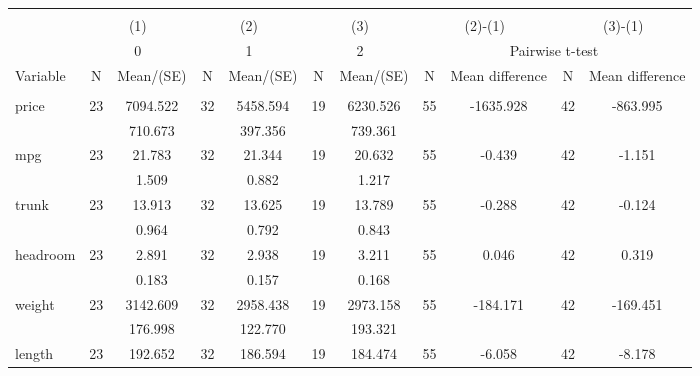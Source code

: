 
\begin{tabular}{@{\extracolsep{5pt}}lcccccccccc}
\\[-1.8ex]\hline \hline \\[-1.8ex]
 & \multicolumn{2}{c}{(1)}  & \multicolumn{2}{c}{(2)}  & \multicolumn{2}{c}{(3)}  & \multicolumn{2}{c}{(2)-(1)} & \multicolumn{2}{c}{(3)-(1)} \\
 & \multicolumn{2}{c}{0}  & \multicolumn{2}{c}{1}  & \multicolumn{2}{c}{2}  & \multicolumn{4}{c}{Pairwise t-test}  \\
Variable & N & Mean/(SE) & N & Mean/(SE) & N & Mean/(SE) & N & Mean difference & N & Mean difference \\ \hline \\[-1.8ex] 
price   & 23    &  7094.522    & 32    &  5458.594    & 19    &  6230.526    & 55    & -1635.928    & 42    &  -863.995   \\
 &   &   710.673  &   &   397.356  &   &   739.361  &   &  &   &   \\
mpg   & 23    &    21.783    & 32    &    21.344    & 19    &    20.632    & 55    &    -0.439    & 42    &    -1.151   \\
 &   &     1.509  &   &     0.882  &   &     1.217  &   &  &   &   \\
trunk   & 23    &    13.913    & 32    &    13.625    & 19    &    13.789    & 55    &    -0.288    & 42    &    -0.124   \\
 &   &     0.964  &   &     0.792  &   &     0.843  &   &  &   &   \\
headroom   & 23    &     2.891    & 32    &     2.938    & 19    &     3.211    & 55    &     0.046    & 42    &     0.319   \\
 &   &     0.183  &   &     0.157  &   &     0.168  &   &  &   &   \\
weight   & 23    &  3142.609    & 32    &  2958.438    & 19    &  2973.158    & 55    &  -184.171    & 42    &  -169.451   \\
 &   &   176.998  &   &   122.770  &   &   193.321  &   &  &   &   \\
length   & 23    &   192.652    & 32    &   186.594    & 19    &   184.474    & 55    &    -6.058    & 42    &    -8.178   \\

\end{tabular}
